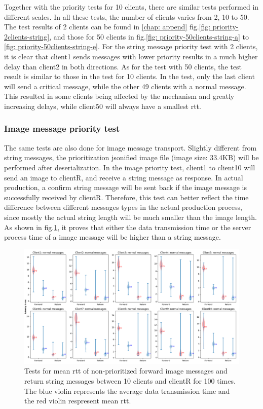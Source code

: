 Together with the priority tests for 10 clients, there are similar tests performed in different scales. 
In all these tests, the number of clients varies from 2, 10 to 50. The test results 
of 2 clients can be found in \ref{chap: append} fig.\ref{fig: priority-2clients-string}, 
and those for 50 clients in fig.\ref{fig: priority-50clients-string-a} to 
\ref{fig: priority-50clients-string-e}. For the string message priority test with 2 clients, 
it is clear that client1 sends messages with lower priority results in 
a much higher delay than client2 in both directions. As for the test with 50 clients, 
the test result is similar to those in the test for 10 clients. In the test, only the 
last client will send a critical message, while the other 49 clients with a normal message. 
This resulted in some clients being affected by the mechanism and greatly increasing delays, 
while client50 will always have a smallest \gls{rtt}.

\subsubsection{Image message priority test}
The same tests are also done for image message transport. Slightly different 
from string messages, the prioritization jsonified image file (image size: 33.4KB) 
will be performed 
after deserialization. In the image priority test, client1 to client10 will send an 
image to clientR, and receive a string message as response. In actual production,
a confirm string message will be sent back if the image message is successfully received 
by clientR. Therefore, this test can better reflect the time difference between 
different messages types in the actual production process, since mostly the actual 
string length will be much smaller than the image length. As shown in fig.\ref{fig: priority-10clients-c}, 
it proves that either the data transmission time or the server process time of a image message 
will be higher than a string message.


\begin{figure}
    \centering
    \includegraphics[width=\textheight]{figures/tests/priority_tests/violin_10clients_image_non_priority.png}\hfill 
    \caption{Tests for mean \gls{rtt} of non-prioritized forward image messages and return string messages between 10 clients 
    and clientR for 100 times. The blue violin represents the average data transmission time and the red violin 
    respresent mean \gls{rtt}.} \label{fig: priority-10clients-c}
\end{figure}


